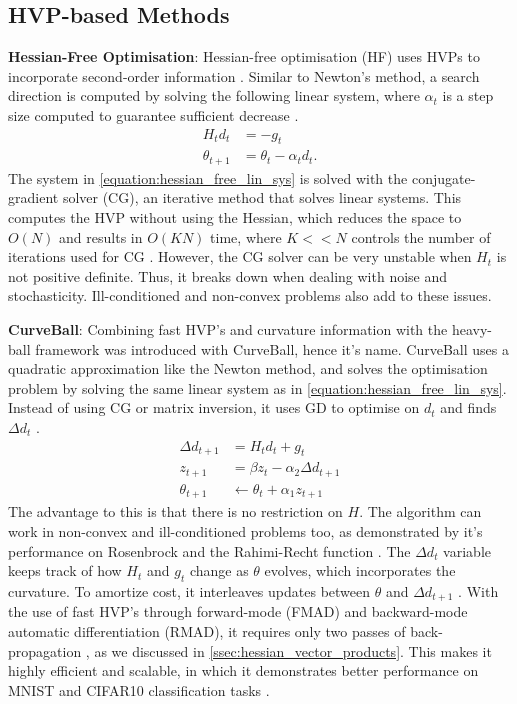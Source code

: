 \subsection{HVP-based Methods}
\label{ssec:hvp_based_methods}

\textbf{Hessian-Free Optimisation}: Hessian-free optimisation (HF) uses HVPs to incorporate second-order information \citep{NoceWrig06, martens2010hessianfree}. Similar to Newton's method, a search direction is computed by solving the following linear system, where $\alpha_t$ is a step size computed to guarantee sufficient decrease \citep{martens2010hessianfree}.
\begin{align}
    H_t d_t &= - g_t \\
    \theta_{t+1} &= \theta_t - \alpha_t d_t.
    \label{equation:hessian_free_lin_sys}
\end{align}
The system in \cref{equation:hessian_free_lin_sys} is solved with the conjugate-gradient solver (CG), an iterative method that solves linear systems. This computes the HVP without using the Hessian, which reduces the space to $O(N)$ and results in $O(KN)$ time, where $K << N$ controls the number of iterations used for CG \citep{martens2010hessianfree}. However, the CG solver can be very unstable when $H_t$ is not positive definite. Thus, it breaks down when dealing with noise and stochasticity. Ill-conditioned and non-convex problems also add to these issues.

\textbf{CurveBall}: Combining fast HVP's and curvature information with the heavy-ball framework was introduced with CurveBall, hence it's name. CurveBall uses a quadratic approximation like the Newton method, and solves the optimisation problem by solving the same linear system as in \cref{equation:hessian_free_lin_sys}. Instead of using CG or matrix inversion, it uses GD to optimise on $d_t$ and finds $\Delta d_t$ \cite{henriques2019small}. 
\begin{align}
    \Delta d_{t+1} &= H_t d_t + g_t \\
    z_{t+1} &= \beta z_{t} - \alpha_2 \Delta d_{t+1} \\
    \theta_{t+1} &\leftarrow \theta_t + \alpha_1 z_{t+1}
\end{align}
The advantage to this is that there is no restriction on $H$. The algorithm can work in non-convex and ill-conditioned problems too, as demonstrated by it's performance on Rosenbrock and the Rahimi-Recht function \citep{henriques2019small}. The $\Delta d_{t}$ variable keeps track of how $H_t$ and $g_t$ change as $\theta$ evolves, which incorporates the curvature. To amortize cost, it interleaves updates between $\theta$ and $\Delta d_{t+1}$ \citep{henriques2019small}. With the use of fast HVP's through forward-mode (FMAD) and backward-mode automatic differentiation (RMAD), it requires only two passes of back-propagation \citep{henriques2019small}, as we discussed in \cref{ssec:hessian_vector_products}. This makes it highly efficient and scalable, in which it demonstrates better performance on MNIST and CIFAR10 classification tasks \citep{henriques2019small}.  

